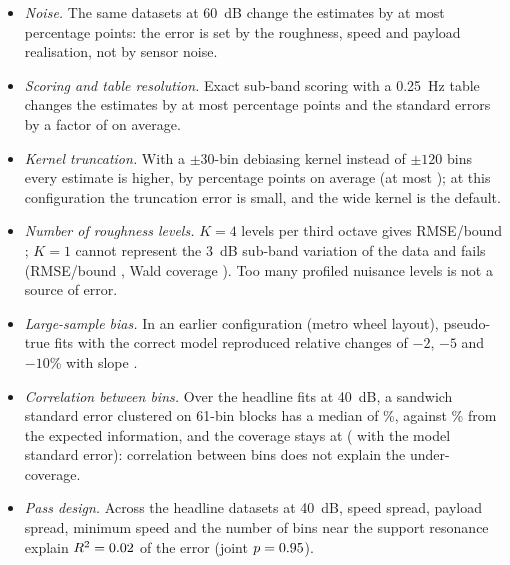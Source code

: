 \begin{itemize}
\item \emph{Noise.} The same datasets at 60~dB change the estimates by at most \BDYSixtyMax{} percentage
  points: the error is set by the roughness, speed and payload realisation, not by sensor noise.
\item \emph{Scoring and table resolution.} Exact sub-band scoring with a 0.25~Hz table changes the
  estimates by at most \ScoreExactMaxDiff{} percentage points and the standard errors by a factor of
  \ScoreExactSERatio{} on average.
\item \emph{Kernel truncation.} With a $\pm30$-bin debiasing kernel instead of $\pm120$ bins every
  estimate is higher, by \BDYKbMean{} percentage points on average (at most \BDYKbMax); at this
  configuration the truncation error is small, and the wide kernel is the default.
\item \emph{Number of roughness levels.} $K=4$ levels per third octave gives RMSE/bound \BDYKFourRatio;
  $K=1$ cannot represent the 3~dB sub-band variation of the data and fails (RMSE/bound \BDYKOneRatio,
  Wald coverage \BDYKOneCov). Too many profiled nuisance levels is not a source of error.
\item \emph{Large-sample bias.} In an earlier configuration (metro wheel layout), pseudo-true fits with
  the correct model reproduced relative changes of $-2$, $-5$ and $-10$\% with slope \CalSlope.
\item \emph{Correlation between bins.} Over the \RSEYN{} headline fits at 40~dB, a sandwich standard
  error clustered on 61-bin blocks has a median of \RSEYBlockSE\%, against \RSEYModelSE\% from the expected
  information, and the coverage stays at \RSEYBlockCov{} (\RSEYModelCov{} with the model standard error):
  correlation between bins does not explain the under-coverage.
\item \emph{Pass design.} Across the \BRegYN{} headline datasets at 40~dB, speed spread, payload spread,
  minimum speed and the number of bins near the support resonance explain $R^2=0.02$ of the error
  (joint $p=0.95$).
\end{itemize}


